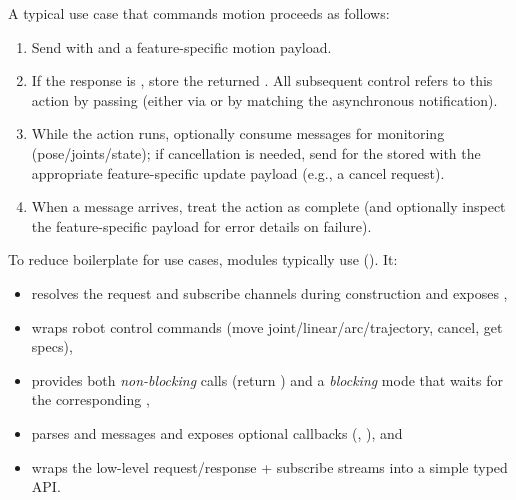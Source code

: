 A typical use case that commands motion proceeds as follows:
\begin{enumerate}
    \item Send  with  and a feature-specific motion payload.
    \item If the response is , store the returned . All subsequent control refers to this action by passing  (either via  or by matching the asynchronous  notification).
    \item While the action runs, optionally consume  messages for monitoring (pose/joints/state); if cancellation is needed, send  for the stored  with the appropriate feature-specific update payload (e.g., a cancel request).
    \item When a  message arrives, treat the action as complete (and optionally inspect the feature-specific payload for error details on failure).
\end{enumerate}

To reduce boilerplate for use cases, modules typically use  (). It:
\begin{itemize}
    \item resolves the request and subscribe channels during construction and exposes ,
    \item wraps robot control commands (move joint/linear/arc/trajectory, cancel, get specs),
    \item provides both \emph{non-blocking} calls (return ) and a \emph{blocking} mode that waits for the corresponding ,
    \item parses  and  messages and exposes optional callbacks (, ), and
    \item wraps the low-level request/response + subscribe streams into a simple typed API.
\end{itemize}

